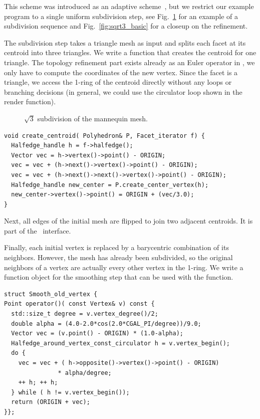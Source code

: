 \label{sec:sqrt3}

This scheme was introduced as an adaptive scheme~\cite{sqrt3}, but we
restrict our example program to a single uniform subdivision step, see
Fig.~\ref{fig:sqrt3} for an example of a subdivision sequence and
Fig.~\ref{fig:sqrt3_basic} for a closeup on the refinement.

The subdivision step takes a triangle mesh as input and splits each
facet at its centroid into three triangles.  We write a function that
creates the centroid for one triangle. The topology refinement part
exists already as an Euler operator in \cgalpoly, we only have to
compute the coordinates of the new vertex. Since the facet is a
triangle, we access the 1-ring of the centroid directly without any
loops or branching decisions (in general, we could use the circulator
loop shown in the render function).%


\begin{figure}[htb]
    \caption{$\sqrt{3}$ subdivision of the mannequin mesh.}
    \label{fig:sqrt3}
\end{figure}


\begin{lstlisting}
void create_centroid( Polyhedron& P, Facet_iterator f) {
  Halfedge_handle h = f->halfedge();
  Vector vec = h->vertex()->point() - ORIGIN;
  vec = vec + (h->next()->vertex()->point() - ORIGIN);
  vec = vec + (h->next()->next()->vertex()->point() - ORIGIN);
  Halfedge_handle new_center = P.create_center_vertex(h);
  new_center->vertex()->point() = ORIGIN + (vec/3.0);
}
\end{lstlisting}%

\noindent
Next, all edges of the initial mesh are flipped to join two
adjacent centroids. It is part of the \cgalpoly\ interface.

Finally, each initial vertex is replaced by a barycentric combination
of its neighbors. However, the mesh has already been subdivided, so
the original neighbors of a vertex are actually every other vertex in
the 1-ring. We write a function object for the smoothing step that
can be used with the  function.

\begin{lstlisting}
struct Smooth_old_vertex {
Point operator()( const Vertex& v) const {
  std::size_t degree = v.vertex_degree()/2;
  double alpha = (4.0-2.0*cos(2.0*CGAL_PI/degree))/9.0;
  Vector vec = (v.point() - ORIGIN) * (1.0-alpha);
  Halfedge_around_vertex_const_circulator h = v.vertex_begin();
  do {
    vec = vec + ( h->opposite()->vertex()->point() - ORIGIN) 
               * alpha/degree;
    ++ h; ++ h;
  } while ( h != v.vertex_begin());
  return (ORIGIN + vec);
}};
\end{lstlisting}%

